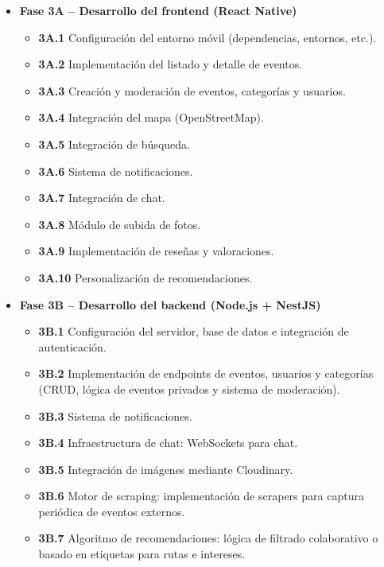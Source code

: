 \begin{itemize}
    \begin{itemize}
        \item \textbf{Fase 3A -- Desarrollo del frontend (React Native)}
        \begin{itemize}
            \item \textbf{3A.1} Configuración del entorno móvil (dependencias, entornos, etc.).
            \item \textbf{3A.2} Implementación del listado y detalle de eventos.
            \item \textbf{3A.3} Creación y moderación de eventos, categorías y usuarios.
            \item \textbf{3A.4} Integración del mapa (OpenStreetMap).
            \item \textbf{3A.5} Integración de búsqueda.
            \item \textbf{3A.6} Sistema de notificaciones.
            \item \textbf{3A.7} Integración de chat.
            \item \textbf{3A.8} Módulo de subida de fotos.
            \item \textbf{3A.9} Implementación de reseñas y valoraciones.
            \item \textbf{3A.10} Personalización de recomendaciones.
        \end{itemize}

        \item \textbf{Fase 3B -- Desarrollo del backend (Node.js + NestJS)}
        \begin{itemize}
            \item \textbf{3B.1} Configuración del servidor, base de datos e integración de autenticación.
            \item \textbf{3B.2} Implementación de endpoints de eventos, usuarios y categorías (CRUD, lógica de eventos privados y sistema de moderación).
            \item \textbf{3B.3} Sistema de notificaciones.
            \item \textbf{3B.4} Infraestructura de chat: WebSockets para chat.
            \item \textbf{3B.5} Integración de imágenes mediante Cloudinary.
            \item \textbf{3B.6} Motor de scraping: implementación de scrapers para captura periódica de eventos externos.
            \item \textbf{3B.7} Algoritmo de recomendaciones: lógica de filtrado colaborativo o basado en etiquetas para rutas e intereses.
        \end{itemize}
    \end{itemize}


\end{itemize}
